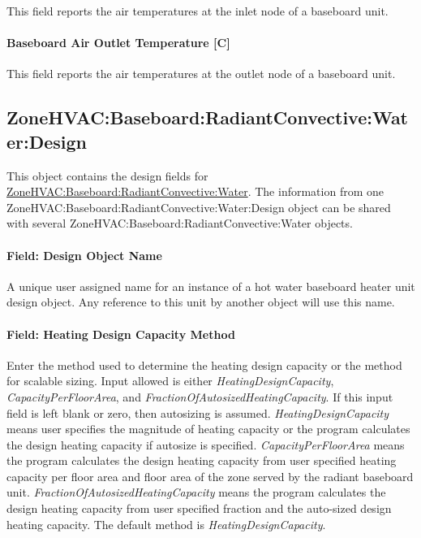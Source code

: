 This field reports the air temperatures at the inlet node of a baseboard unit.

\paragraph{Baseboard Air Outlet Temperature {[}C{]}}\label{baseboard-air-outlet-temperature-c}

This field reports the air temperatures at the outlet node of a baseboard unit.

\subsection{ZoneHVAC:Baseboard:RadiantConvective:Water:Design}\label{zonehvac-baseboard-radiantconvective-water-design}

This object contains the design fields for \hyperref[zonehvacbaseboardradiantconvectivewater] {ZoneHVAC:Baseboard:RadiantConvective:Water}. The information from one ZoneHVAC:Baseboard:RadiantConvective:Water:Design object can be shared with several ZoneHVAC:Baseboard:RadiantConvective:Water objects.

\paragraph{Field: Design Object Name}\label{HW_BB_DesignObjectName}

A unique user assigned name for an instance of a hot water baseboard heater unit design object. Any reference to this unit by another object will use this name.

\paragraph{Field: Heating Design Capacity Method}\label{field-heating-design-capacity-method-000}

Enter the method used to determine the heating design capacity or the method for scalable sizing. Input allowed is either \emph{HeatingDesignCapacity}, \emph{CapacityPerFloorArea}, and \emph{FractionOfAutosizedHeatingCapacity}. If this input field is left blank or zero, then autosizing is assumed. \emph{HeatingDesignCapacity} means user specifies the magnitude of heating capacity or the program calculates the design heating capacity if autosize is specified. \emph{CapacityPerFloorArea} means the program calculates the design heating capacity from user specified heating capacity per floor area and floor area of the zone served by the radiant baseboard unit. \emph{FractionOfAutosizedHeatingCapacity} means the program calculates the design heating capacity from user specified fraction and the auto-sized design heating capacity. The default method is \emph{HeatingDesignCapacity}.

